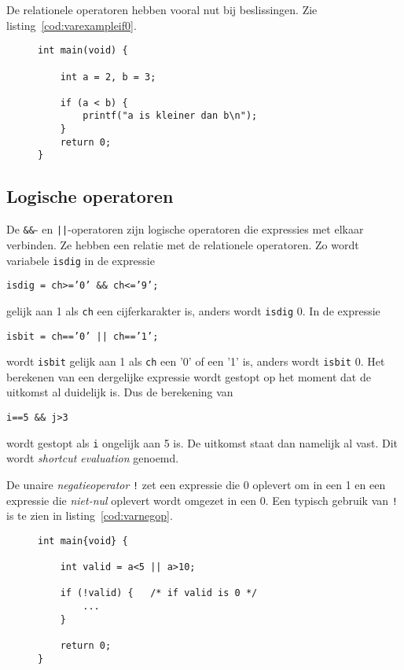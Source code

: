 De relationele operatoren hebben vooral nut bij beslissingen. Zie listing~\ref{cod:varexampleif0}.

\begin{figure}[H]
\begin{lstlisting}[caption=Voorbeeld van een beslissing.,label=cod:varexampleif0]
int main(void) {

    int a = 2, b = 3;

    if (a < b) {
        printf("a is kleiner dan b\n");
    }
    return 0;
}
\end{lstlisting}
\end{figure}

\subsection{Logische operatoren}
De \texttt{\&\&}- en \texttt{||}-operatoren zijn logische operatoren die expressies met elkaar verbinden. Ze hebben een relatie met de relationele operatoren. Zo wordt variabele \texttt{isdig} in de expressie

\hspace*{1em}\texttt{isdig = ch>='0' \&\& ch<='9';}

gelijk aan 1 als \texttt{ch} een cijferkarakter is, anders wordt \texttt{isdig} 0. In de expressie

\hspace*{1em}\texttt{isbit = ch=='0' || ch=='1';}

wordt \texttt{isbit} gelijk aan 1 als \texttt{ch} een '0' of een '1' is, anders wordt \texttt{isbit} 0. Het berekenen van een dergelijke expressie wordt gestopt op het moment dat de uitkomst al duidelijk is. Dus de berekening van

\hspace*{1em}\texttt{i==5 \&\& j>3}

wordt gestopt als \texttt{i} ongelijk aan 5 is. De uitkomst staat dan namelijk al vast. Dit wordt \textsl{shortcut evaluation} genoemd.

De unaire \textsl{negatieoperator} \texttt{!} zet een expressie die 0 oplevert om in een 1 en een expressie die \textsl{niet-nul} oplevert wordt omgezet in een 0. Een typisch gebruik van \texttt{!} is te zien in listing~\ref{cod:varnegop}.

\begin{figure}[!ht]
\begin{lstlisting}[caption=Voorbeeld van de negatieoperator.,label=cod:varnegop]
int main{void} {

    int valid = a<5 || a>10;

    if (!valid) {   /* if valid is 0 */
        ...
    }

    return 0;
}
\end{lstlisting}
\end{figure}

